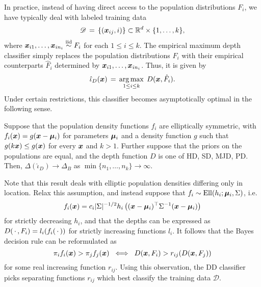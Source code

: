 In practice, instead of having direct access to the population distributions
$F_i$, we have typically deal with labeled training data
\begin{equation}
    \mathscr{D} \,=\, \{(\bm{x}_{ij}, i)\} \subset \mathbb{R}^d \times \{1, \dots, k\},
\end{equation}
where $\bm{x}_{i1}, \dots, \bm{x}_{in_i} \overset{\text{iid}}{\sim} F_i$ for each $1 \leq i \leq k$.
The empirical maximum depth classifier simply replaces the population
distributions $F_i$ with their empirical counterparts $\hat{F}_i$ determined
by $\bm{x}_{i1}, \dots, \bm{x}_{in_i}$. Thus, it is given by
\begin{equation}
    \hat{\iota}_{D}(\bm{x}) \,=\, \operatorname*{arg\,max}_{1 \leq i \leq k}\; D(\bm{x}, \hat{F}_i).
\end{equation}
Under certain restrictions, this classifier becomes asymptotically optimal in
the following sense.

\begin{theorem}
    Suppose that the population density functions $f_i$ are elliptically
    symmetric, with $f_i(\bm{x}) = g(\bm{x} - \bm{\mu}_i)$ for parameters $\bm{\mu}_i$ and a
    density function $g$ such that $g(k\bm{x}) \leq g(\bm{x})$ for every $\bm{x}$ and
    $k > 1$. Further suppose that the priors on the populations are equal, and
    the depth function $D$ is one of HD, SD, MJD, PD. Then,
    $\Delta(\hat{\iota}_{D}) \to \Delta_B$ as $\min\{n_1, \dots,
    n_k\} \to \infty$.
\end{theorem}

Note that this result deals with elliptic population densities differing only
in location.
Relax this assumption, and instead suppose that $f_i \sim \operatorname{Ell}(h_i; \bm{\mu}_i,
\Sigma)$, i.e.
\begin{equation}
    f_i(\bm{x}) = c_i |\Sigma|^{-1/2} h_i\left((\bm{x} - \bm{\mu}_i)^\top \Sigma^{-1} (\bm{x} - \bm{\mu}_i)\right)
\end{equation}
for strictly decreasing $h_i$, and that the depths can be expressed as
$D(\,\cdot\,, F_i) = l_i(f_i(\,\cdot\,))$ for strictly increasing functions $l_i$.
It follows that the Bayes decision rule can be reformulated as
\begin{equation}
    \pi_i f_i(\bm{x}) > \pi_j f_j(\bm{x}) \;\iff\; D(\bm{x}, F_i) > r_{ij}(D(\bm{x}, F_j))
\end{equation}
for some real increasing function $r_{ij}$.
Using this observation, the DD classifier \parencite{li-albertos-liu-2012}
picks separating functions $r_{ij}$ which best classify the training data
$\mathscr{D}$.

